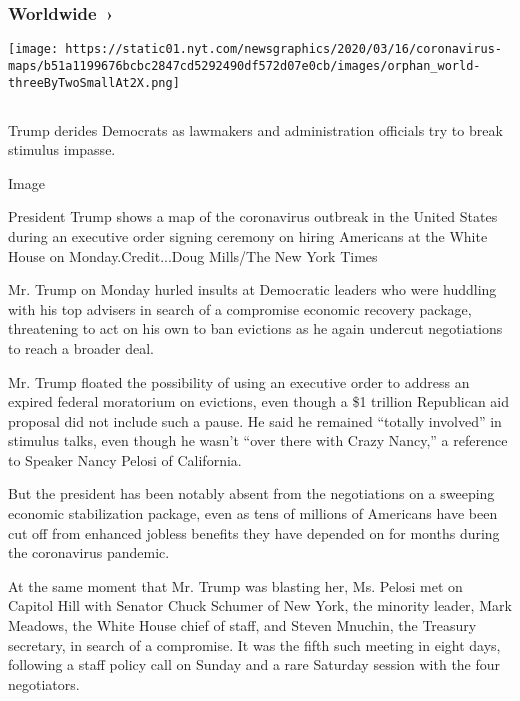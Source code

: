 \href{https://www.nytimes.com/interactive/2020/world/coronavirus-maps.html}{}

\hypertarget{worldwide-}{%
\subsubsection{Worldwide~›}\label{worldwide-}}

\texttt{[image: https://static01.nyt.com/newsgraphics/2020/03/16/coronavirus-maps/b51a1199676bcbc2847cd5292490df572d07e0cb/images/orphan\_world-threeByTwoSmallAt2X.png]}

\hypertarget{-1}{%
\subsection{}\label{-1}}

Trump derides Democrats as lawmakers and administration officials try to
break stimulus impasse.

Image

President Trump shows a map of the coronavirus outbreak in the United
States during an executive order signing ceremony on hiring Americans at
the White House on Monday.Credit...Doug Mills/The New York Times

Mr. Trump on Monday hurled insults at Democratic leaders who were
huddling with his top advisers in search of a compromise economic
recovery package, threatening to act on his own to ban evictions as he
again undercut negotiations to reach a broader deal.

Mr. Trump floated the possibility of using an executive order to address
an expired federal moratorium on evictions, even though a \$1 trillion
Republican aid proposal did not include such a pause. He said he
remained ``totally involved'' in stimulus talks, even though he wasn't
``over there with Crazy Nancy,'' a reference to Speaker Nancy Pelosi of
California.

But the president has been notably absent from the negotiations on a
sweeping economic stabilization package, even as tens of millions of
Americans have been cut off from enhanced jobless benefits they have
depended on for months during the coronavirus pandemic.

At the same moment that Mr. Trump was blasting her, Ms. Pelosi met on
Capitol Hill with Senator Chuck Schumer of New York, the minority
leader, Mark Meadows, the White House chief of staff, and Steven
Mnuchin, the Treasury secretary, in search of a compromise. It was the
fifth such meeting in eight days, following a staff policy call on
Sunday and a rare Saturday session with the four negotiators.

